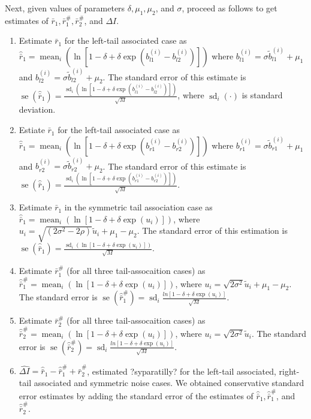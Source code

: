 \documentclass[letterpaper,11pt]{article}
\DeclareMathOperator{\mean}{mean}
\DeclareMathOperator{\se}{se}
\DeclareMathOperator{\sd}{sd}
\begin{document}
\noindent Next, given values of parameters $\delta, \mu_1, \mu_2$, and $\sigma$, proceed as follows to get estimates of $\bar r_1, \bar r_1^{\#}, \bar r_2^{\#}$, and $\Delta I$. 

\begin{enumerate}

\item Estimate $\bar r_1$ for the left-tail associated case as $\hat \bar r_1 = \mean_i (\ln [1-\delta+\delta\exp(b_{l1}^{(i)}-b_{l2}^{(i)})])$ where $b_{l1}^{(i)} = \sigma \tilde b_{l1}^{(i)} + \mu_1$ and $b_{l2}^{(i)} = \sigma \tilde b_{l2}^{(i)} + \mu_2$. The standard error of this estimate is $\se (\hat \bar r_1) =\frac{\sd _i (\ln[1-\delta +\delta \exp(b_{l1}^{(i)}-b_{l2}^{(i)})])}{\sqrt M}$, where $\sd _i(\cdot)$ is standard deviation. 

\item Estiate $\bar r_1$ for the left-tail associated case as $\hat \bar r_1 = \mean_i (\ln [1-\delta+\delta\exp(b_{r1}^{(i)}-b_{r2}^{(i)})])$ where $b_{r1}^{(i)} = \sigma \tilde b_{r1}^{(i)} + \mu_1$ and $b_{r2}^{(i)} = \sigma \tilde b_{r2}^{(i)} + \mu_2$. The standard error of this estimate is $\se (\hat \bar r_1) =\frac{\sd _i (\ln[1-\delta +\delta \exp(b_{r1}^{(i)}-b_{r2}^{(i)})])}{\sqrt M}$. 

\item Estimate $\bar r_1$ in the symmetric tail association case as $\hat \bar r_1=\mean_i(\ln[1-\delta+\delta \exp(u_i)])$, where $u_i = \sqrt{(2\sigma^2-2\rho)}\tilde u_i + \mu_1 - \mu_2$. The standard error of this estimation is $\se(\hat \bar r_1) = \frac {\sd_i(\ln[1-\delta+\delta \exp(u_i)])}{\sqrt M}$. 

\item Estimate $\bar r_1^{\#}$ (for all three tail-assocaition cases) as $\hat \bar r_1^{\#} = \mean_i(\ln[1-\delta+\delta \exp(u_i)])$, where $u_i = \sqrt{2\sigma^2}\tilde u_i + \mu_1 - \mu_2$. The standard error is $\se(\hat \bar r_1^{\#}) = \sd_i \frac{ln[1-\delta+\delta \exp(u_i)]}{\sqrt M}$.    

\item Estimate $\bar r_2^{\#}$ (for all three tail-assocaition cases) as $\hat \bar r_2^{\#} = \mean_i(\ln[1-\delta+\delta \exp(u_i)])$, where $u_i = \sqrt{2\sigma^2}\tilde u_i$. The standard error is $\se(\hat \bar r_2^{\#}) = \sd_i \frac{ln[1-\delta+\delta \exp(u_i)]}{\sqrt M}$.    

\item $\hat {\Delta I} = \hat \bar r_1 - \hat \bar r_1^{\#} + \hat \bar r_2^{\#}$, estimated ?syparatilly? for the left-tail associated, right-tail associated and symmetric noise cases. We obtained conservative standard error estimates by adding the standard error of the estimates of $\hat \bar r_1, \hat \bar r_1^{\#}$, and $\hat \bar r_2^{\#}$.

\end{enumerate}
\end{document}
